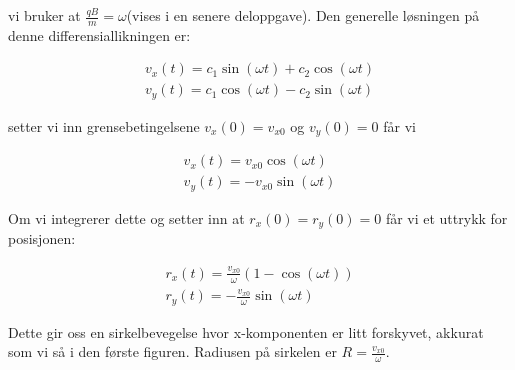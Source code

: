 \documentclass[a4paper,norsk, 10pt]{article}
\begin{document}
vi bruker at $\frac{qB}{m} = \omega$(vises i en senere deloppgave). Den generelle løsningen på denne differensiallikningen er:

\begin{equation}
\begin{split}
v_x(t) = c_1\sin(\omega t) + c_2\cos(\omega t)
\\
v_y(t) = c_1\cos(\omega t) - c_2\sin(\omega t)
\end{split}
\end{equation}

setter vi inn grensebetingelsene $v_x(0) = v_{x0}$ og $v_y(0) = 0$ får vi 

\begin{equation}
\begin{split}
v_x(t) = v_{x0}\cos(\omega t)
\\
v_y(t) = -v_{x0}\sin(\omega t)
\end{split}
\end{equation}

Om vi integrerer dette og setter inn at $r_x(0) = r_y(0) = 0$ får vi et uttrykk for posisjonen:

\begin{equation}
\begin{split}
r_x(t) = \frac{v_{x0}}{\omega}(1-\cos(\omega t))
\\
r_y(t) = -\frac{v_{x0}}{\omega}\sin(\omega t)
\end{split}
\end{equation}

Dette gir oss en sirkelbevegelse hvor x-komponenten er litt forskyvet, akkurat som vi så i den første figuren. Radiusen på sirkelen er $R = \frac{v_{x0}}{\omega}$. 
\end{document}
